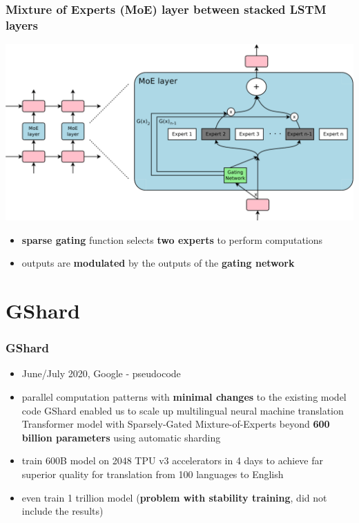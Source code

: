\documentclass{beamer}
\begin{document}
\begin{frame}
    \frametitle{Mixture of Experts (MoE) layer between stacked LSTM layers}
    \includegraphics[scale=0.25]{img/moe_layer.png}
    \begin{itemize}
        \item \textbf{sparse gating} function selects \textbf{two experts} to perform computations
        \item outputs are \textbf{modulated} by the outputs of the \textbf{gating network}
    \end{itemize}
\end{frame}



\section{GShard}
\begin{frame}
    \frametitle{GShard \cite{gshard}}
    \begin{itemize}
        \item June/July 2020, Google - pseudocode
        \item parallel computation patterns with \textbf{minimal changes} to the existing model code
GShard enabled us to scale up multilingual neural machine translation Transformer
model with Sparsely-Gated Mixture-of-Experts beyond \textbf{600 billion parameters}
using automatic sharding
        \item train 600B model on 2048 TPU v3 accelerators in 4 days to achieve far superior quality for translation from 100 languages to English
        \item even train 1 trillion model (\textbf{problem with stability training}, did not include the results)
    \end{itemize}
\end{frame}
\end{document}
